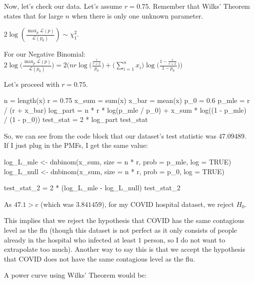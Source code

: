 \documentclass[
  letterpaper,
  DIV=11,
  numbers=noendperiod]{scrreprt}
\newenvironment{Shaded}{\begin{snugshade}}{\end{snugshade}}
\newcommand{\NormalTok}[1]{\textcolor[rgb]{0.00,0.23,0.31}{#1}}
\begin{document}
Now, let's check our data. Let's assume \(r = 0.75\). Remember that
Wilks' Theorem states that for large \(n\) when there is only one
unknown parameter.

\(2 \log(\frac{\max_{p} \mathcal{L}(p)}{\mathcal{L}(p_0)}) \sim \chi^2_1\).

For our Negative Binomial:
\(2\log \Big(\frac{\max_{p} \mathcal{L}(p)}{\mathcal{L}(p_0)} \Big) = 2 \Bigg(nr \log \Big(\frac{\frac{r}{r + \bar{x}}}{p_0}\Big) + \Big(\sum_{i=1}^n x_i \Big)\log \Big( \frac{1-\frac{r}{r + \bar{x}}}{1-p_0} \Big) \Bigg)\)

Let's proceed with \(r=0.75\).

\begin{Shaded}
\begin{Highlighting}[]
\NormalTok{n = length(x)}
\NormalTok{r = 0.75}
\NormalTok{x\_sum = sum(x)}
\NormalTok{x\_bar = mean(x)}
\NormalTok{p\_0 = 0.6}
\NormalTok{p\_mle = r / (r + x\_bar)}
\NormalTok{log\_part = n * r * log(p\_mle / p\_0) + x\_sum * log((1 {-} p\_mle) / (1 {-} p\_0))}
\NormalTok{test\_stat = 2 * log\_part}
\NormalTok{test\_stat}
\end{Highlighting}
\end{Shaded}

So, we can see from the code block that our dataset's test statistic was
47.09489. If I just plug in the PMFs, I get the same value:

\begin{Shaded}
\begin{Highlighting}[]
\NormalTok{log\_L\_mle  \textless{}{-} dnbinom(x\_sum, size = n * r, prob = p\_mle, log = TRUE)}
\NormalTok{log\_L\_null \textless{}{-} dnbinom(x\_sum, size = n * r, prob = p\_0, log = TRUE)}

\NormalTok{test\_stat\_2 = 2 * (log\_L\_mle {-} log\_L\_null)}
\NormalTok{test\_stat\_2}
\end{Highlighting}
\end{Shaded}

As \(47.1 > c\) (which was \(3.841459\)), for my COVID hospital dataset,
we reject \(H_0\).

This implies that we reject the hypothesis that COVID has the same
contagious level as the flu (though this dataset is not perfect as it
only consists of people already in the hospital who infected at least
\(1\) person, so I do not want to extrapolate too much). Another way to
say this is that we accept the hypothesis that COVID does not have the
same contagious level as the flu.

A power curve using Wilks' Theorem would be:
\end{document}
